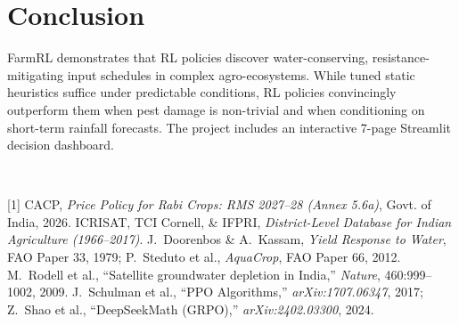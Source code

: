 \documentclass[10pt,twocolumn]{article}
\begin{document}
\section{Conclusion}
FarmRL demonstrates that RL policies discover water-conserving, resistance-mitigating input schedules in complex agro-ecosystems. While tuned static heuristics suffice under predictable conditions, RL policies convincingly outperform them when pest damage is non-trivial and when conditioning on short-term rainfall forecasts. The project includes an interactive 7-page Streamlit decision dashboard.

\vspace{2.0pt}
\\[1.0pt]
{\scriptsize
[1] CACP, \textit{Price Policy for Rabi Crops: RMS 2027--28 (Annex 5.6a)}, Govt. of India, 2026. \quad
[2] ICRISAT, TCI Cornell, \& IFPRI, \textit{District-Level Database for Indian Agriculture (1966--2017)}. \quad
[3] J.~Doorenbos \& A.~Kassam, \textit{Yield Response to Water}, FAO Paper 33, 1979; P.~Steduto et al., \textit{AquaCrop}, FAO Paper 66, 2012. \quad
[4] M.~Rodell et al., ``Satellite groundwater depletion in India,'' \textit{Nature}, 460:999--1002, 2009. \quad
[5] J.~Schulman et al., ``PPO Algorithms,'' \textit{arXiv:1707.06347}, 2017; Z.~Shao et al., ``DeepSeekMath (GRPO),'' \textit{arXiv:2402.03300}, 2024.\par
}
\end{document}
